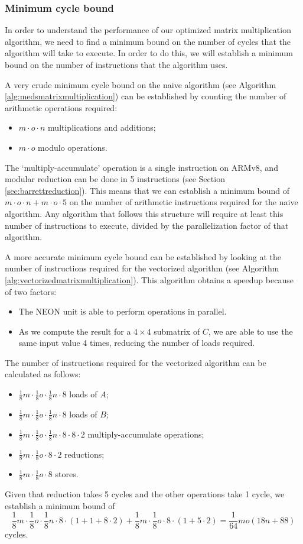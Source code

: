 \documentclass[11pt,a4paper]{report}
\theoremstyle{definition}
\begin{document}
\subsubsection{Minimum cycle bound}
In order to understand the performance of our optimized matrix multiplication algorithm, we need to find a minimum bound on the number of cycles that the algorithm will take to execute. In order to do this, we will establish a minimum bound on the number of instructions that the algorithm uses.

A very crude minimum cycle bound on the naive algorithm (see Algorithm \ref{alg:medsmatrixmultiplication}) can be established by counting the number of arithmetic operations required:
\begin{itemize}
  \item $m \cdot o \cdot n$ multiplications and additions;
  \item $m \cdot o$ modulo operations.
\end{itemize}
The `multiply-accumulate' operation is a single instruction on ARMv8, and modular reduction can be done in 5 instructions (see Section \ref{sec:barrettreduction}). This means that we can establish a minimum bound of $m \cdot o \cdot n + m \cdot o \cdot 5$ on the number of arithmetic instructions required for the naive algorithm. Any algorithm that follows this structure will require at least this number of instructions to execute, divided by the parallelization factor of that algorithm.

A more accurate minimum cycle bound can be established by looking at the number of instructions required for the vectorized algorithm (see Algorithm \ref{alg:vectorizedmatrixmultiplication}). This algorithm obtains a speedup because of two factors:
\begin{itemize}
  \item The NEON unit is able to perform operations in parallel.
  \item As we compute the result for a $4\times4$ submatrix of $C$, we are able to use the same input value 4 times, reducing the number of loads required.
\end{itemize}
The number of instructions required for the vectorized algorithm can be calculated as follows:
\begin{itemize}
  \item $\frac{1}{8}m \cdot \frac{1}{8}o \cdot \frac{1}{8}n \cdot 8$ loads of $A$;
  \item $\frac{1}{8}m \cdot \frac{1}{8}o \cdot \frac{1}{8}n \cdot 8$ loads of $B$;
  \item $\frac{1}{8}m \cdot \frac{1}{8}o \cdot \frac{1}{8}n \cdot 8 \cdot 8 \cdot 2$ multiply-accumulate operations;
  \item $\frac{1}{8}m \cdot \frac{1}{8}o \cdot 8 \cdot 2$ reductions;
  \item $\frac{1}{8}m \cdot \frac{1}{8}o \cdot 8$ stores.
\end{itemize}
Given that reduction takes 5 cycles and the other operations take 1 cycle, we establish a minimum bound of 
\[
  \frac{1}{8}m \cdot \frac{1}{8}o \cdot \frac{1}{8}n \cdot 8 \cdot (1 + 1 + 8 \cdot 2) + \frac{1}{8}m \cdot \frac{1}{8}o \cdot 8 \cdot (1 + 5 \cdot 2) = \frac{1}{64}mo(18n + 88)
\]
cycles.
\end{document}

